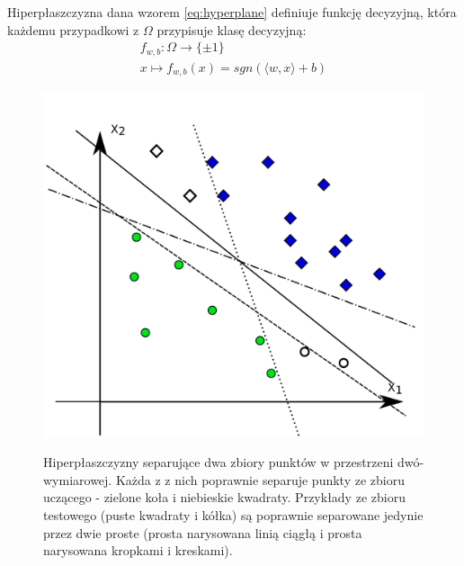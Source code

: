 Hiperpłaszczyzna dana wzorem \ref{eq:hyperplane} definiuje funkcję decyzyjną, która każdemu przypadkowi z $ \Omega $ przypisuje klasę decyzyjną:
\begin{equation}
\begin{array}{lcl}
f_{w,b}: \Omega \rightarrow \{\pm 1\} \\ x \mapsto f_{w,b}(x) = sgn (\langle w, x \rangle + b)
\end{array}
\label{eq:decfunc}
\end{equation}

\begin{figure}[h]
\centering
\includegraphics[scale=0.5]{figures/functions/2-different-hyperplanes}
\label{fig:hyperplanes}
\caption{Hiperpłaszczyzny separujące dwa zbiory punktów w przestrzeni dwó-wymiarowej. Każda z z nich poprawnie separuje punkty ze zbioru uczącego - zielone koła i niebieskie kwadraty. Przykłady ze zbioru testowego (puste kwadraty i kółka) są poprawnie separowane jedynie przez dwie proste (prosta narysowana linią ciągłą i prosta narysowana kropkami i kreskami).}
\end{figure}


